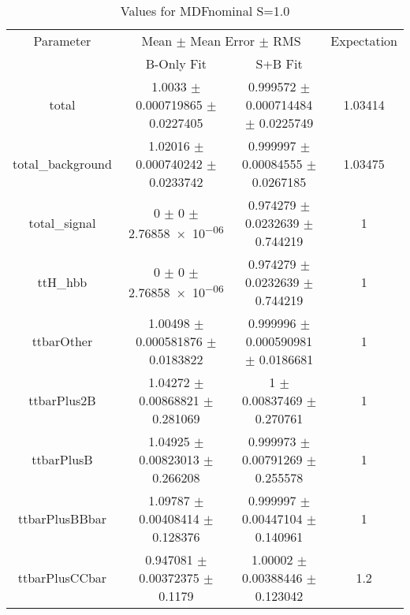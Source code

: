 \begin{table}
\centering
\caption{Values for MDFnominal S=1.0}
\begin{tabular}{cccc}
\toprule
Parameter & \multicolumn{2}{c}{Mean $\pm$ Mean Error $\pm$ RMS} & Expectation\\
 & B-Only Fit & S+B Fit & \\
\midrule
total & \num{1.0033} $\pm$ \num{0.000719865} $\pm$ \num{0.0227405} & \num{0.999572} $\pm$ \num{0.000714484} $\pm$ \num{0.0225749} & \num{1.03414}\\
total\_background & \num{1.02016} $\pm$ \num{0.000740242} $\pm$ \num{0.0233742} & \num{0.999997} $\pm$ \num{0.00084555} $\pm$ \num{0.0267185} & \num{1.03475}\\
total\_signal & \num{0} $\pm$ \num{0} $\pm$ \num{2.76858e-06} & \num{0.974279} $\pm$ \num{0.0232639} $\pm$ \num{0.744219} & \num{1}\\
ttH\_hbb & \num{0} $\pm$ \num{0} $\pm$ \num{2.76858e-06} & \num{0.974279} $\pm$ \num{0.0232639} $\pm$ \num{0.744219} & \num{1}\\
ttbarOther & \num{1.00498} $\pm$ \num{0.000581876} $\pm$ \num{0.0183822} & \num{0.999996} $\pm$ \num{0.000590981} $\pm$ \num{0.0186681} & \num{1}\\
ttbarPlus2B & \num{1.04272} $\pm$ \num{0.00868821} $\pm$ \num{0.281069} & \num{1} $\pm$ \num{0.00837469} $\pm$ \num{0.270761} & \num{1}\\
ttbarPlusB & \num{1.04925} $\pm$ \num{0.00823013} $\pm$ \num{0.266208} & \num{0.999973} $\pm$ \num{0.00791269} $\pm$ \num{0.255578} & \num{1}\\
ttbarPlusBBbar & \num{1.09787} $\pm$ \num{0.00408414} $\pm$ \num{0.128376} & \num{0.999997} $\pm$ \num{0.00447104} $\pm$ \num{0.140961} & \num{1}\\
ttbarPlusCCbar & \num{0.947081} $\pm$ \num{0.00372375} $\pm$ \num{0.1179} & \num{1.00002} $\pm$ \num{0.00388446} $\pm$ \num{0.123042} & \num{1.2}\\
\bottomrule
\end{tabular}
\end{table}